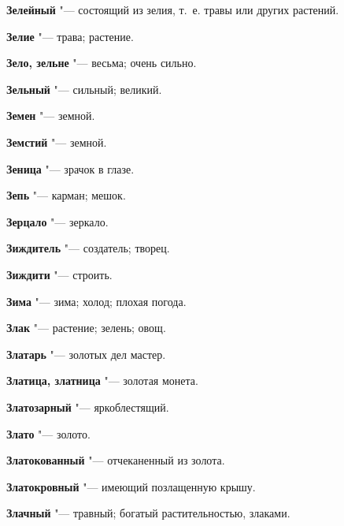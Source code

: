 \begin{mymulticols}{2}
\noindent\textbf{Зелейный} "--- состоящий из зелия, т.~е. травы или других растений. 




\noindent\textbf{Зелие} "--- трава; растение. 




\noindent\textbf{Зело, зельне} "--- весьма; очень сильно. 




\noindent\textbf{Зельный} "--- сильный; великий. 




\noindent\textbf{Земен} "--- земной. 




\noindent\textbf{Земстий} "--- земной. 




\noindent\textbf{Зеница} "--- зрачок в глазе. 




\noindent\textbf{Зепь} "--- карман; мешок. 




\noindent\textbf{Зерцало} "--- зеркало. 




\noindent\textbf{Зиждитель} "--- создатель; творец. 




\noindent\textbf{Зиждити} "--- строить. 




\noindent\textbf{Зима} "--- зима; холод; плохая погода. 




\noindent\textbf{Злак} "--- растение; зелень; овощ. 




\noindent\textbf{Златарь} "--- золотых дел мастер. 




\noindent\textbf{Златица, златница} "--- золотая монета. 




\noindent\textbf{Златозарный} "--- яркоблестящий. 




\noindent\textbf{Злато} "--- золото. 




\noindent\textbf{Златокованный} "--- отчеканенный из золота. 




\noindent\textbf{Златокровный} "--- имеющий позлащенную крышу. 




\noindent\textbf{Злачный} "--- травный; богатый растительностью, злаками. 





\end{mymulticols}
